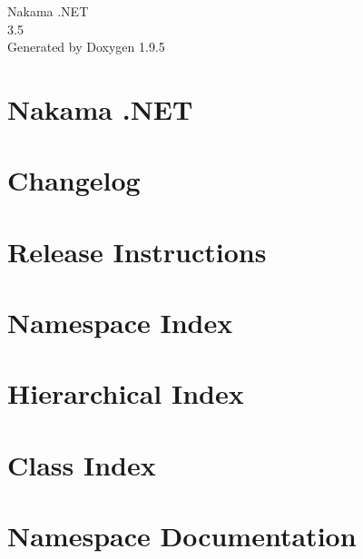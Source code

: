 \documentclass[twoside]{book}
\newcommand{\+}{\discretionary{\mbox{\scriptsize$\hookleftarrow$}}{}{}}
\newcommand{\clearemptydoublepage}{%
    \newpage{\pagestyle{empty}\cleardoublepage}%
  }
\begin{document}
  \raggedbottom
    \hypersetup{pageanchor=false,
                bookmarksnumbered=true,
                pdfencoding=unicode
               }
  \begin{titlepage}
  \vspace*{7cm}
  \begin{center}%
  {\Large Nakama .\+NET}\\
  [1ex]\large 3.\+5 \\
  \vspace*{1cm}
  {\large Generated by Doxygen 1.9.5}\\
  \end{center}
  \end{titlepage}
  \clearemptydoublepage
  \tableofcontents
  \clearemptydoublepage
  \hypersetup{pageanchor=true}
\chapter{Nakama .NET}
\label{index}\hypertarget{index}{}
\chapter{Changelog}
\label{md__c_h_a_n_g_e_l_o_g}

\chapter{Release Instructions}
\label{md__r_e_l_e_a_s_e_i_n_s_t}

\chapter{Namespace Index}

\chapter{Hierarchical Index}

\chapter{Class Index}

\chapter{Namespace Documentation}













\end{document}
